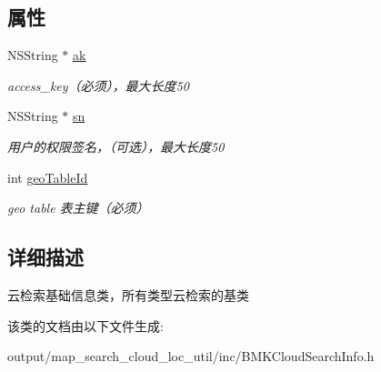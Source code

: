 \subsection*{属性}
\begin{DoxyCompactItemize}
\item 
\hypertarget{interface_b_m_k_base_cloud_search_info_a3ac025d61069505d4ff685e4c77b78a4}{N\+S\+String $\ast$ \hyperlink{interface_b_m_k_base_cloud_search_info_a3ac025d61069505d4ff685e4c77b78a4}{ak}}\label{interface_b_m_k_base_cloud_search_info_a3ac025d61069505d4ff685e4c77b78a4}

\begin{DoxyCompactList}\small\item\em access\+\_\+key（必须），最大长度50 \end{DoxyCompactList}\item 
\hypertarget{interface_b_m_k_base_cloud_search_info_a0dcbea8108d264a217566025d43aff12}{N\+S\+String $\ast$ \hyperlink{interface_b_m_k_base_cloud_search_info_a0dcbea8108d264a217566025d43aff12}{sn}}\label{interface_b_m_k_base_cloud_search_info_a0dcbea8108d264a217566025d43aff12}

\begin{DoxyCompactList}\small\item\em 用户的权限签名，（可选），最大长度50 \end{DoxyCompactList}\item 
\hypertarget{interface_b_m_k_base_cloud_search_info_acb6f48270abf3f46a0412bcd658d099c}{int \hyperlink{interface_b_m_k_base_cloud_search_info_acb6f48270abf3f46a0412bcd658d099c}{geo\+Table\+Id}}\label{interface_b_m_k_base_cloud_search_info_acb6f48270abf3f46a0412bcd658d099c}

\begin{DoxyCompactList}\small\item\em geo table 表主键（必须） \end{DoxyCompactList}\end{DoxyCompactItemize}


\subsection{详细描述}
云检索基础信息类，所有类型云检索的基类 

该类的文档由以下文件生成\+:\begin{DoxyCompactItemize}
\item 
output/map\+\_\+search\+\_\+cloud\+\_\+loc\+\_\+util/inc/B\+M\+K\+Cloud\+Search\+Info.\+h\end{DoxyCompactItemize}
